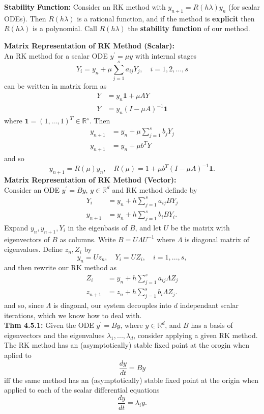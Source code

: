 \documentclass[10pt,a4paper]{article}
\newcommand{\R}{\mathbb{R}}
\begin{document}
\begin{multicols*}{2}
\textbf{Stability Function:} Consider an RK method with $y_{n+1} = R(h\lambda)y_n$ (for scalar ODEs). Then $R(h\lambda)$ is a rational function, and if the method is \textbf{explicit} then $R(h\lambda)$ is a polynomial. Call $R(h\lambda)$ the \textbf{stability function} of our method.

\textbf{Matrix Representation of RK Method (Scalar):}\\
 An RK method for a scalar ODE $y^\prime = \mu y$ with internal stages 
\[
Y_i = y_n + \mu\sum_{j=1}^s a_{ij}Y_j, \quad i = 1,2,...,s    
\]
can be written in matrix form as
\begin{align*}
    Y &= y_n \mathbf{1} + \mu A Y \\
    Y &= y_n(I - \mu A)^{-1}\mathbf{1}     
\end{align*}
where $\mathbf{1} = (1,...,1)^T \in \R^s$. Then
\begin{align*}
    y_{n+1} &= y_n + \mu \sum_{j=1}^s b_j Y_j\\
    y_{n+1} &= y_n + \mu b^T Y 
\end{align*}
and so 
\[
y_{n+1} = R(\mu)y_n, \quad R(\mu) = 1 + \mu b^T(I - \mu A)^{-1}\mathbf{1}.  
\]
\textbf{Matrix Representation of RK Method (Vector):}\\
Consider an ODE $y^\prime = By$, $y \in \R^d$ and RK method definde by
\begin{align*}
    Y_i     &= y_n + h\sum_{j=1}^s a_{ij}BY_j \\
    y_{n+1} &= y_n + h\sum_{j=1}^s b_iBY_i.
\end{align*}
Expand $y_n, y_{n+1}, Y_i$ in the eigenbasis of $B$, and let $U$ be the matrix with eigenvectors of $B$ as columns. Write $B = U\Lambda U^{-1}$ where $\Lambda$ is diagonal matrix of eigenvalues. Define $z_n, Z_i$ by 
\[
y_n = Uz_n, \quad Y_i = UZ_i, \quad i = 1,...,s,    
\]
and then rewrite our RK method as 
\begin{align*}
    Z_i     &= y_n + h\sum_{j=1}^s a_{ij}\Lambda Z_j \\
    z_{n+1} &= z_n + h\sum_{j=1}^s b_i\Lambda Z_j.
\end{align*}
and so, since $\Lambda$ is diagonal, our system decouples into $d$ independant scalar iterations, which we know how to deal with.\\

\textbf{Thm 4.5.1:} Given the ODE $y^\prime = By$, where $y \in \R^d$, and $B$ has a basis of eigenvectors and the eigenvalues $\lambda_1, ..., \lambda_d$, consider applying a given RK method. The RK method has an (asymptotically) stable fixed point at the orogin when aplied to 
\[
\frac{dy}{dt} = By    
\]
iff the same method has an (asymptotically) stable fixed point at the origin when applied to each of the scalar differential equations 
\[
\frac{dy}{dt} = \lambda_i y. 
\]


\end{multicols*}
\end{document}
